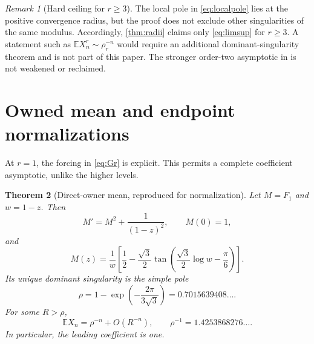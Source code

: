 \documentclass[10pt,a4paper]{amsart}
\newtheorem{theorem}{Theorem}[section]
\theoremstyle{definition}
\theoremstyle{remark}
\newtheorem{remark}[theorem]{Remark}
\newcommand{\E}{\mathbb E}
\begin{document}
\begin{remark}[Hard ceiling for $r\geq3$]\label{rem:ceiling}
The local pole in \eqref{eq:localpole} lies at the positive convergence
radius, but the proof does not exclude other singularities of the same
modulus.  Accordingly, \cref{thm:radii} claims only \eqref{eq:limsup} for
$r\geq3$.  A statement such as
$\E X_n^r\sim\rho_r^{-n}$ would require an additional dominant-singularity
theorem and is not part of this paper.  The stronger order-two asymptotic in
\citet{DisantoEtAl2022} is not weakened or reclaimed.
\end{remark}

\section{Owned mean and endpoint normalizations}

At $r=1$, the forcing in \eqref{eq:Gr} is explicit.  This permits a complete
coefficient asymptotic, unlike the higher levels.

\begin{theorem}[Direct-owner mean, reproduced for normalization]\label{thm:mean}
Let $M=F_1$ and $w=1-z$.  Then
\begin{equation}\label{eq:meanode}
 M'=M^2+\frac1{(1-z)^2},\qquad M(0)=1,
\end{equation}
and
\begin{equation}\label{eq:meanclosed}
 M(z)=\frac1w\left[
 \frac12-\frac{\sqrt3}{2}
 \tan\!\left(\frac{\sqrt3}{2}\log w-\frac\pi6\right)
 \right].
\end{equation}
Its unique dominant singularity is the simple pole
\begin{equation}\label{eq:rho}
 \rho=1-\exp\!\left(-\frac{2\pi}{3\sqrt3}\right)
      =0.7015639408\ldots .
\end{equation}
For some $R>\rho$,
\begin{equation}\label{eq:meanasymptotic}
 \E X_n=\rho^{-n}+O(R^{-n}),\qquad
 \rho^{-1}=1.4253868276\ldots .
\end{equation}
In particular, the leading coefficient is one.
\end{theorem}
\end{document}

